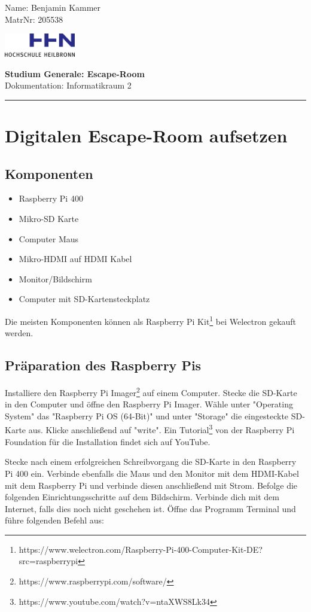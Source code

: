 \documentclass[12pt, letterpaper]{article}
\renewcommand\maketitle{
    \begin{flushleft}
        Name: Benjamin Kammer \\
        MatrNr: 205538
    \end{flushleft}

    \begin{flushright}\vspace{-15mm}
        \includegraphics[width=3.1cm]{logo.png}
    \end{flushright}

    \begin{center}
        \textbf{\large Studium Generale: Escape-Room}\\
        Dokumentation: Informatikraum 2
    \end{center}

    \rule{\linewidth}{0.1mm}

    \bigskip
}
\begin{document}
\maketitle

\section{Digitalen Escape-Room aufsetzen}
\subsection{Komponenten}

\begin{itemize}
	\item Raspberry Pi 400
    \item Mikro-SD Karte
	\item Computer Maus
	\item Mikro-HDMI auf HDMI Kabel
	\item Monitor/Bildschirm
    \item Computer mit SD-Kartensteckplatz
\end{itemize}

Die meisten Komponenten können als Raspberry Pi Kit\footnote{https://www.welectron.com/Raspberry-Pi-400-Computer-Kit-DE?src=raspberrypi} bei Welectron gekauft werden.

\subsection{Präparation des Raspberry Pis}

Installiere den Raspberry Pi Imager\footnote{https://www.raspberrypi.com/software/} auf einem Computer.
Stecke die SD-Karte in den Computer und öffne den Raspberry Pi Imager.
Wähle unter "Operating System" das "Raspberry Pi OS (64-Bit)" und unter "Storage" die eingesteckte SD-Karte aus.
Klicke anschließend auf "write".
Ein Tutorial\footnote{https://www.youtube.com/watch?v=ntaXWS8Lk34} von der Raspberry Pi Foundation für die Installation findet sich auf YouTube.

Stecke nach einem erfolgreichen Schreibvorgang die SD-Karte in den Raspberry Pi 400 ein.
Verbinde ebenfalls die Maus und den Monitor mit dem HDMI-Kabel mit dem Raspberry Pi und verbinde diesen anschließend mit Strom.
Befolge die folgenden Einrichtungsschritte auf dem Bildschirm.
Verbinde dich mit dem Internet, falls dies noch nicht geschehen ist.
Öffne das Programm Terminal und führe folgenden Befehl aus:
\end{document}
